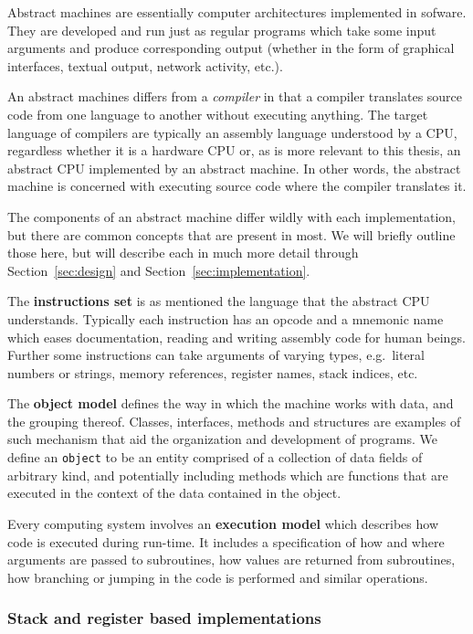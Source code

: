 Abstract machines are essentially computer architectures implemented in
sofware. They are developed and run just as regular programs which take some
input arguments and produce corresponding output (whether in the form of
graphical interfaces, textual output, network activity, etc.).

An abstract machines differs from a \textit{compiler} in that a compiler
translates source code from one language to another without executing
anything. The target language of compilers are typically an assembly language
understood by a CPU, regardless whether it is a hardware CPU or, as is more
relevant to this thesis, an abstract CPU implemented by an abstract machine. In
other words, the abstract machine is concerned with executing source code where
the compiler translates it.

The components of an abstract machine differ wildly with each implementation,
but there are common concepts that are present in most. We will briefly outline
those here, but will describe each in much more detail through
Section~\ref{sec:design} and Section~\ref{sec:implementation}.

The \textbf{instructions set} is as mentioned the language that the abstract CPU
understands. Typically each instruction has an opcode and a mnemonic name which
eases documentation, reading and writing assembly code for human beings. Further
some instructions can take arguments of varying types, e.g.~literal numbers or
strings, memory references, register names, stack indices, etc.

The \textbf{object model} defines the way in which the machine works with data,
and the grouping thereof. Classes, interfaces, methods and structures are
examples of such mechanism that aid the organization and development of
programs. We define an \texttt{object} to be an entity comprised of a collection
of data fields of arbitrary kind, and potentially including methods which are
functions that are executed in the context of the data contained in the object.

Every computing system involves an \textbf{execution model} which describes how
code is executed during run-time. It includes a specification of how and where
arguments are passed to subroutines, how values are returned from subroutines,
how branching or jumping in the code is performed and similar operations.

\subsubsection{Stack and register based implementations}

